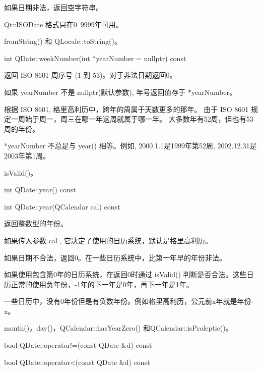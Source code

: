 如果日期非法，返回空字符串。


\begin{notice}[警告]
Qt::ISODate 格式只在0~9999年可用。
\end{notice}

\begin{notice}[另请参阅]
fromString() 和 QLocale::toString()。
\end{notice}


\splitLine

int QDate::weekNumber(int *yearNumber = nullptr) const

返回 ISO 8601 周序号 (1 到 53)。对于非法日期返回0。

如果 yearNumber 不是 nullptr(默认参数), 年号返回值存于 *yearNumber。

根据 ISO 8601, 格里高利历中，跨年的周属于天数更多的那年。 由于 ISO 8601 规定一周始于周一，周三在哪一年这周就属于哪一年。 大多数年有52周，但也有53周的年份。

\begin{notice}
 *yearNumber 不总是与 year() 相等。例如, 2000.1.1是1999年第52周, 2002.12.31是2003年第1周。
\end{notice}

\begin{notice}[另请参阅]
isValid()。
\end{notice}

\splitLine

int QDate::year() const

int QDate::year(QCalendar cal) const

返回整数型的年份。

如果传入参数 cal , 它决定了使用的日历系统，默认是格里高利历。

如果日期不合法，返回0。在一些日历系统中，比第一年早的年份非法。

如果使用包含第0年的日历系统，在返回0时通过 isValid() 判断是否合法。这些日历正常的使用负年份，-1年的下一年是0年，再下一年是1年。

一些日历中，没有0年份但是有负数年份。例如格里高利历，公元前x年就是年份-x。

\begin{notice}[另请参阅]
month()，day()，QCalendar::hasYearZero() 和QCalendar::isProleptic()。
\end{notice}



\splitLine

bool QDate::operator!=(const QDate \&d) const

bool QDate::operator<(const QDate \&d) const

